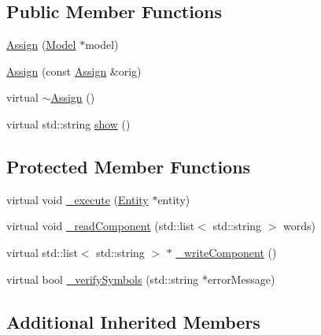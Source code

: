 \subsection*{Public Member Functions}
\begin{DoxyCompactItemize}
\item 
\hyperlink{class_assign_afaa746a0ce157d4606823ad508dc6281}{Assign} (\hyperlink{class_model}{Model} $\ast$model)
\item 
\hyperlink{class_assign_ae4945adcf1b5dcdd3f57faa9dd85a2b0}{Assign} (const \hyperlink{class_assign}{Assign} \&orig)
\item 
virtual \hyperlink{class_assign_aa005626af06022d9101c5e38e794dc47}{$\sim$\-Assign} ()
\item 
virtual std\-::string \hyperlink{class_assign_a8f069af07c958138f610e13bf3303893}{show} ()
\end{DoxyCompactItemize}
\subsection*{Protected Member Functions}
\begin{DoxyCompactItemize}
\item 
virtual void \hyperlink{class_assign_a5fabf69268b2e65d8b01ce247be87a40}{\-\_\-execute} (\hyperlink{class_entity}{Entity} $\ast$entity)
\item 
virtual void \hyperlink{class_assign_a47728ac75ef40025f00cca46e04dd012}{\-\_\-read\-Component} (std\-::list$<$ std\-::string $>$ words)
\item 
virtual std\-::list$<$ std\-::string $>$ $\ast$ \hyperlink{class_assign_a6231f1e819d6baab3c9af142fd5b566a}{\-\_\-write\-Component} ()
\item 
virtual bool \hyperlink{class_assign_a5f3a7d8a7214574fea926cae1b1acb94}{\-\_\-verify\-Symbols} (std\-::string $\ast$error\-Message)
\end{DoxyCompactItemize}
\subsection*{Additional Inherited Members}


